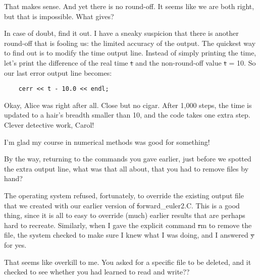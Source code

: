 \bob
That makes sense.  And yet there is no round-off.  It seems like we
are both right, but that is impossible.  What gives?

\carol
In case of doubt, find it out.  I have a sneaky suspicion that there
is another round-off that is fooling us: the limited accuracy of the
output.  The quickest way to find out is to modify the time output
line.  Instead of simply printing the time, let's print the difference
of the real time {\st t} and the non-round-off value {\st t = 10}.  So
our last error output line becomes:

\cba

\begin{small}
\begin{verbatim}
	cerr << t - 10.0 << endl;
\end{verbatim}
\end{small}


\abc

\bob
Okay, Alice was right after all.  Close but no cigar.  After 1,000
steps, the time is updated to a hair's breadth smaller than 10, and
the code takes one extra step.  Clever detective work, Carol!

\carol
I'm glad my course in numerical methods was good for something!

\bob
By the way, returning to the commands you gave earlier, just before we
spotted the extra output line, what was that all about, that you had
to remove files by hand?

\carol
The operating system refused, fortunately, to override the existing
output file that we created with our earlier version of {\st
forward\_euler2.C}.  This is a good thing, since it is all to easy to
override (much) earlier results that are perhaps hard to recreate.
Similarly, when I gave the explicit command {\st rm} to remove the
file, the system checked to make sure I knew what I was doing, and I
answered {\st y} for yes.

\bob
That seems like overkill to me.  You asked for a specific file to be
deleted, and it checked to see whether you had learned to read and write??

